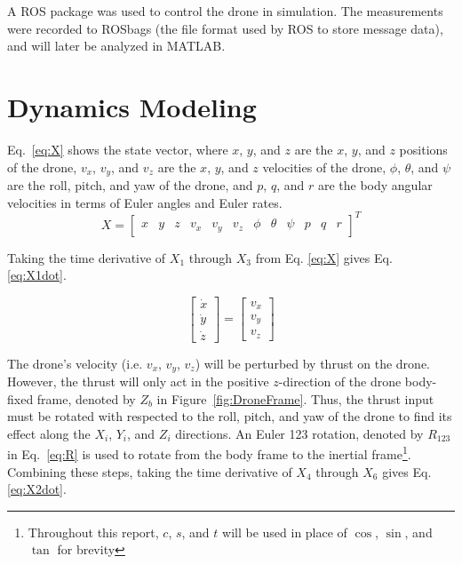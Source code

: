 \documentclass[letterpaper, paper,11pt]{AAS}	%
\begin{document}
A ROS package was used to control the drone in simulation. The measurements were recorded to ROSbags (the file format used by ROS to store message data), and will later be analyzed in MATLAB.

\section{Dynamics Modeling}

Eq.~\eqref{eq:X} shows the state vector, where $x$, $y$, and $z$ are the $x$, $y$, and $z$ positions of the drone, $v_x$, $v_y$, and $v_z$ are the $x$, $y$, and $z$ velocities of the drone, $\phi$, $\theta$, and $\psi$ are the roll, pitch, and yaw of the drone, and $p$, $q$, and $r$ are the body angular velocities in terms of Euler angles and Euler rates. 
\setcounter{MaxMatrixCols}{12}
\begin{equation}
	\label{eq:X}
	X = \begin{bmatrix}
		x & y & z & v_x & v_y & v_z & \phi & \theta & \psi & p & q & r
\end{bmatrix}^T
\end{equation}

Taking the time derivative of $X_1$ through $X_3$ from Eq. \eqref{eq:X} gives Eq. \eqref{eq:X1dot}.

\begin{equation}
\begin{bmatrix}
\dot{x}\\
\dot{y}\\
\dot{z}
\end{bmatrix} =
\begin{bmatrix}
v_x \\
v_y\\
v_z
\end{bmatrix}
\label{eq:X1dot}
\end{equation}

The drone's velocity (i.e. $v_x$, $v_y$, $v_z$) will be perturbed by thrust on the drone. However, the thrust will only act in the positive $z$-direction of the drone body-fixed frame, denoted by $Z_b$ in Figure~\ref{fig:DroneFrame}. Thus, the thrust input must be rotated with respected to the roll, pitch, and yaw of the drone to find its effect along the $X_i$, $Y_i$, and $Z_i$ directions. An Euler 123 rotation, denoted by $R_{123}$ in Eq.~\eqref{eq:R} is used to rotate from the body frame to the inertial frame\footnote{Throughout this report, $c$, $s$, and $t$ will be used in place of $\cos$, $\sin$, and $\tan$ for brevity}. Combining these steps, taking the time derivative of $X_4$ through $X_6$ gives Eq. \eqref{eq:X2dot}.
\end{document}
